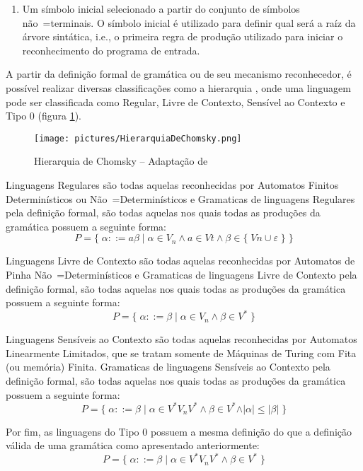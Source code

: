{\begin{enumerate}
        \item Um símbolo inicial selecionado a partir do conjunto de símbolos não~=terminais.
        O símbolo inicial é utilizado para definir qual será a raíz da árvore sintática,
        i.e.,
        o primeira regra de produção utilizado para iniciar o reconhecimento do programa de entrada.
    \end{enumerate}

    A partir da definição formal de gramática ou de seu mecanismo reconhecedor,
    é possível realizar diversas classificações como a
    hierarquia ,
    onde uma linguagem pode ser classificada como Regular,
    Livre de Contexto,
    Sensível ao Contexto e
    Tipo 0 (figura \ref{fig:pictures/HierarquiaDeChomsky.png}).
    \begin{figure}[H]
    \centering
    \texttt{[image: pictures/HierarquiaDeChomsky.png]}
    \caption{Hierarquia de Chomsky -- Adaptação de }
    \label{fig:pictures/HierarquiaDeChomsky.png}
    \end{figure}

    Linguagens Regulares são todas aquelas reconhecidas por
    Automatos Finitos Determinísticos ou
    Não~=Determinísticos e
    Gramaticas de linguagens Regulares pela definição formal,
    são todas aquelas nos quais todas as produções da gramática possuem a seguinte forma:
    $$ P = \{\; \alpha ::= a \beta \;|\; \alpha \in V_n \land a \in Vt
                \land \beta \in \{\; Vn \cup \varepsilon\; \} \;\} $$

    Linguagens Livre de Contexto são todas aquelas
    reconhecidas por Automatos de Pinha
    Não~=Determinísticos e
    Gramaticas de linguagens Livre de Contexto pela definição formal,
    são todas aquelas nos quais todas as produções da gramática possuem a seguinte forma:
    $$ P = \{\; \alpha ::= \beta \;|\; \alpha \in V_n \land \beta \in V^* \;\} $$

    Linguagens Sensíveis ao Contexto são todas aquelas
    reconhecidas por Automatos Linearmente Limitados,
    que se tratam somente de Máquinas de Turing com Fita (ou memória) Finita.
    Gramaticas de linguagens Sensíveis ao Contexto pela definição formal,
    são todas aquelas nos quais todas as produções da gramática possuem a seguinte forma:
    $$ P = \{\; \alpha ::= \beta \;|\; \alpha \in V^* V_n V^* \land \beta \in V^*
                \land \vert\alpha\vert \leq \vert\beta\vert \;\} $$

    Por fim,
    as linguagens do Tipo 0 possuem a mesma definição do que a definição
    válida de uma gramática como apresentado anteriormente:
    $$ P = \{\; \alpha ::= \beta \;|\; \alpha \in V^* V_n V^* \land \beta \in V^* \;\} $$

}
